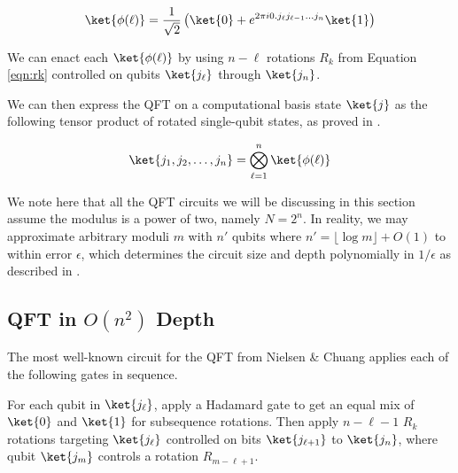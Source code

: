\begin{equation}
\ket{\phi(\ell)} = \frac{1}{\sqrt{2}}\left( \ket{0} +
e^{2\pi i 0.j_\ell j_{\ell-1} \ldots j_n} \ket{1} \right)
\end{equation}

We can enact each $\ket{\phi(\ell)}$ by using $n-\ell$ rotations
$R_k$ from Equation \ref{eqn:rk} controlled on qubits $\ket{j_\ell}$
through $\ket{j_n}$.

We can then express the QFT on a computational basis state $\ket{j}$ as
the following tensor product of rotated single-qubit states, as proved in
\cite{Nielsen2000}.

\begin{equation}
\ket{j_1, j_2, \ldots, j_n} = \bigotimes_{\ell=1}^{n} \ket{\phi(\ell)}
\end{equation}


We note here that all the QFT circuits we will be discussing in this section
assume the modulus is a power of two, namely $N=2^n$. In reality, we may
approximate arbitrary moduli $m$ with $n'$ qubits where
$n' = \lfloor\log m\rfloor + O(1)$ to within error $\epsilon$, which determines
the circuit size and depth polynomially in $1/\epsilon$
as described in \cite{Cleve2000}.

\subsection{QFT in $O(n^2)$ Depth}
\label{subsec:qft-quad}

The most well-known circuit for the QFT from Nielsen \& Chuang
\cite{Nielsen2000} applies each of the following gates in sequence.

For each qubit in $\ket{j_\ell}$, apply a Hadamard gate to get an equal mix of
$\ket{0}$ and $\ket{1}$ for subsequence rotations. Then apply $n-\ell-1$
$R_k$ rotations targeting $\ket{j_\ell}$ controlled on bits $\ket{j_{\ell+1}}$
to $\ket{j_n}$, where qubit $\ket{j_m}$ controls a rotation $R_{m-\ell+1}$.


